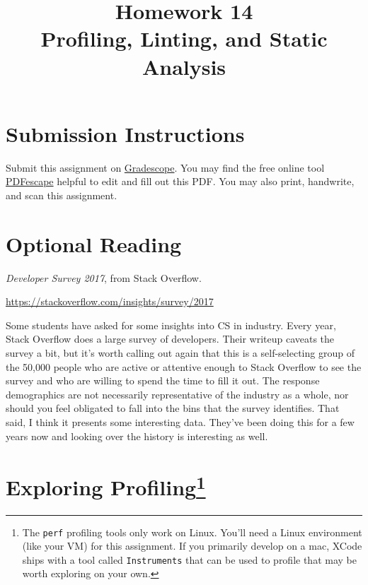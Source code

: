 \documentclass{article}
\begin{document}
\fancyhead[L]{}
\fancyhead[R]{}

\fancyfoot[C]{\color{gray} \thepage~/~\pageref*{LastPage}}
\pagestyle{fancyplain}



\title{\textbf{Homework 14\\Profiling, Linting, and Static Analysis}}
\author{\textbf{\color{red}{Due: Saturday, April 15, 10:00PM (Hard Deadline)}}}
\date{}
\maketitle


\section*{Submission Instructions}
Submit this assignment on \href{https://gradescope.com/courses/5574}{Gradescope}.
You may find the free online tool \href{https://www.pdfescape.com}{PDFescape}
helpful to edit and fill out this PDF.
You may also print, handwrite, and scan this assignment.

\section*{Optional Reading}

\emph{Developer Survey 2017}, from Stack Overflow.

\url{https://stackoverflow.com/insights/survey/2017}

Some students have asked for some insights into CS in industry. Every year,
Stack Overflow does a large survey of developers. Their writeup caveats the
survey a bit, but it's worth calling out again that this is a self-selecting
group of the 50,000 people who are active or attentive enough to Stack
Overflow to see the survey and who are willing to spend the time to fill it
out. The response demographics are not necessarily representative of the
industry as a whole, nor should you feel obligated to fall into the bins that
the survey identifies. That said, I think it presents some interesting data.
They've been doing this for a few years now and looking over the history is
interesting as well.


\newpage


\section{Exploring Profiling\protect\footnote{%
  The \texttt{perf} profiling tools only work on Linux. You'll need a Linux
  environment (like your VM) for this assignment. If you primarily develop on
  a mac, XCode ships with a tool called \texttt{Instruments} that can be used
  to profile that may be worth exploring on your own.
}}
\end{document}
